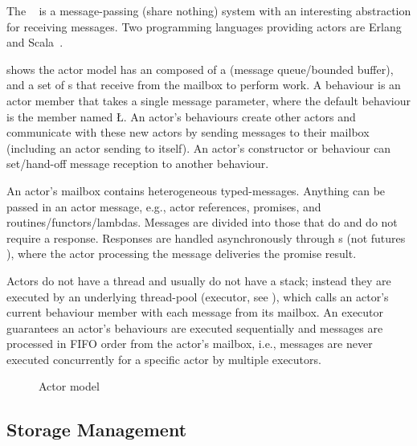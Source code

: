 \documentclass[openright,twoside]{report}
\begin{document}
The ~\cite{Hewitt73,Actors} is a message-passing (share nothing) system with an interesting abstraction for receiving messages.
Two programming languages providing actors are Erlang~\cite{Erlang} and Scala~\cite{Scala}.

 shows the actor model has an  composed of a  (message queue/bounded buffer), and a set of s that receive from the mailbox to perform work.
A behaviour is an actor member that takes a single message parameter, where the default behaviour is the member named \LGinlinetrue\LGbegin\lgrinde\L{}\endlgrinde\LGend{}.
An actor's behaviours create other actors and communicate with these new actors by sending messages to their mailbox (including an actor sending to itself).
An actor's constructor or behaviour can set/hand-off message reception to another behaviour.

An actor's mailbox contains heterogeneous typed-messages.
Anything can be passed in an actor message, e.g., actor references, promises, and routines/functors/lambdas.
Messages are divided into those that do and do not require a response.
Responses are handled asynchronously through \emph{}s (not futures ), where the actor processing the message deliveries the promise result.

Actors do not have a thread and usually do not have a stack;
instead they are executed by an underlying thread-pool (executor, see ), which calls an actor's current behaviour member with each message from its mailbox.
An executor guarantees an actor's behaviours are executed sequentially and messages are processed in FIFO order from the actor's mailbox, i.e., messages are never executed concurrently for a specific actor by multiple executors.

\begin{figure}
\centering

\caption{Actor model}
\label{f:ActorModel}
\end{figure}


\subsection{Storage Management}
\end{document}
